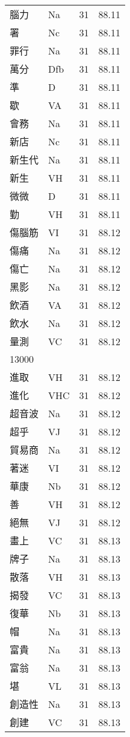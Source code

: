 \documentclass[twocolumn]{book}
\begin{document}
\begin{supertabular}{llrr}
腦力 & Na & 31 &  88.11\\
署 & Nc & 31 &  88.11\\
罪行 & Na & 31 &  88.11\\
萬分 & Dfb & 31 &  88.11\\
準 & D & 31 &  88.11\\
歇 & VA & 31 &  88.11\\
會務 & Na & 31 &  88.11\\
新店 & Nc & 31 &  88.11\\
新生代 & Na & 31 &  88.11\\
新生 & VH & 31 &  88.11\\
微微 & D & 31 &  88.11\\
勤 & VH & 31 &  88.11\\
傷腦筋 & VI & 31 &  88.12\\
傷痛 & Na & 31 &  88.12\\
傷亡 & Na & 31 &  88.12\\
黑影 & Na & 31 &  88.12\\
飲酒 & VA & 31 &  88.12\\
飲水 & Na & 31 &  88.12\\
量測 & VC & 31 &  88.12\\
13000\\
進取 & VH & 31 &  88.12\\
進化 & VHC & 31 &  88.12\\
超音波 & Na & 31 &  88.12\\
超乎 & VJ & 31 &  88.12\\
貿易商 & Na & 31 &  88.12\\
著迷 & VI & 31 &  88.12\\
華康 & Nb & 31 &  88.12\\
善 & VH & 31 &  88.12\\
絕無 & VJ & 31 &  88.12\\
畫上 & VC & 31 &  88.13\\
牌子 & Na & 31 &  88.13\\
散落 & VH & 31 &  88.13\\
揭發 & VC & 31 &  88.13\\
復華 & Nb & 31 &  88.13\\
帽 & Na & 31 &  88.13\\
富貴 & Na & 31 &  88.13\\
富翁 & Na & 31 &  88.13\\
堪 & VL & 31 &  88.13\\
創造性 & Na & 31 &  88.13\\
創建 & VC & 31 &  88.13\\

\end{supertabular}
\end{document}
